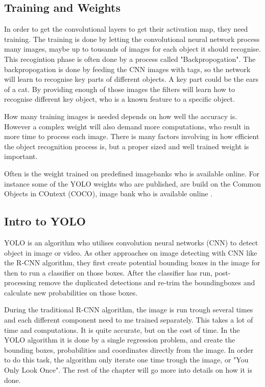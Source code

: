 \subsection{Training and Weights}

In order to get the convolutional layers to get their activation map, they need training. The training is done by letting the convolutional neural network process many images, maybe up to tousands of images for each object it should recognise. This recogintion phase is often done by a process called "Backpropogation". The backpropogation is done by feeding the CNN images with tags, so the network will learn to recognise key parts of different objects. A key part could be the ears of a cat. By providing enough of those images the filters will learn how to recognise different key object, who is a known feature to a specific object.

How many training images is needed depends on how well the accuracy is. However a complex weight will also demand more computations, who result in more time to process each image. There is many factors involving in how efficient the object recognition process is, but a proper sized and well trained weight is important.

Often is the weight trained on predefined imagebanks who is available online. For instance some of the YOLO weights who are published, are build on the Common Objects in COntext (COCO), image bank who is available online \cite{darknet13}.

\subsection{Intro to YOLO}\label{yolo_intro}
YOLO is an algorithm who utilises convolution neural networks (CNN) to detect object in image or video. As other approaches on image detecting with CNN like the R-CNN algorithm, they first create potential bounding boxes in the image for then to run a classifier on those boxes. After the classifier has run, post-processing remove the duplicated detections and re-trim the boundingboxes and calculate new probabilities on those boxes. \cite{rcnn}

During the traditional R-CNN algorithm, the image is run trough several times and each different component need to me trained separately. This takes a lot of time and computations. It is quite accurate, but on the cost of time. In the YOLO algorithm it is done by a single regression problem, and create the bounding boxes, probabilities and coordinates directly from the image. In order to do this task, the algorithm only iterate one time trough the image, or "You Only Look Once". The rest of the chapter will go more into details on how it is done.

